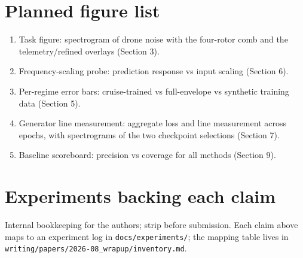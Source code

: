 \documentclass[journal]{IEEEtran}
\begin{document}
\appendices

\section{Planned figure list}
\label{app:figures}

\begin{enumerate}
\item Task figure: spectrogram of drone noise with the four-rotor comb and
  the telemetry/refined overlays (Section 3).
\item Frequency-scaling probe: prediction response vs input scaling
  (Section 6).
\item Per-regime error bars: cruise-trained vs full-envelope vs synthetic
  training data (Section 5).
\item Generator line measurement: aggregate loss and line measurement across
  epochs, with spectrograms of the two checkpoint selections (Section 7).
\item Baseline scoreboard: precision vs coverage for all methods (Section 9).
\end{enumerate}

\section{Experiments backing each claim}
\label{app:experiments}

Internal bookkeeping for the authors; strip before submission. Each claim
above maps to an experiment log in \texttt{docs/experiments/}; the mapping
table lives in \texttt{writing/papers/2026-08\_wrapup/inventory.md}.



\end{document}
